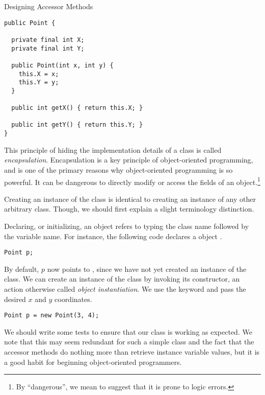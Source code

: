 \begin{cl}{Designing Accessor Methods}
\begin{lstlisting}[language=MyJava]
public Point {

  private final int X;
  private final int Y;
  
  public Point(int x, int y) {
    this.X = x;
    this.Y = y;
  }
  
  public int getX() { return this.X; }
  
  public int getY() { return this.Y; }
}
\end{lstlisting}
\end{cl}

This principle of hiding the implementation details of a class is called \textit{encapsulation}. Encapsulation is a key principle of object-oriented programming, and is one of the primary reasons why object-oriented programming is so powerful. It can be dangerous to directly modify or access the fields of an object.\footnote{By ``dangerous'', we mean to suggest that it is prone to logic errors.} 

Creating an instance of the  class is identical to creating an instance of any other arbitrary class. Though, we should first explain a slight terminology distinction.

Declaring, or initializing, an object refers to typing the class name followed by the variable name. For instance, the following code declares a  object .

\begin{verbatim}
Point p;
\end{verbatim}

By default, $p$ now points to , since we have not yet created an instance of the  class. We can create an instance of the  class by invoking its constructor, an action otherwise called \textit{object instantiation}. We use the  keyword and pass the desired $x$ and $y$ coordinates. 

\begin{verbatim}
Point p = new Point(3, 4);
\end{verbatim}

We should write some tests to ensure that our  class is working as expected. We note that this may seem redundant for such a simple class and the fact that the accessor methods do nothing more than retrieve instance variable values, but it is a good habit for beginning object-oriented programmers.


